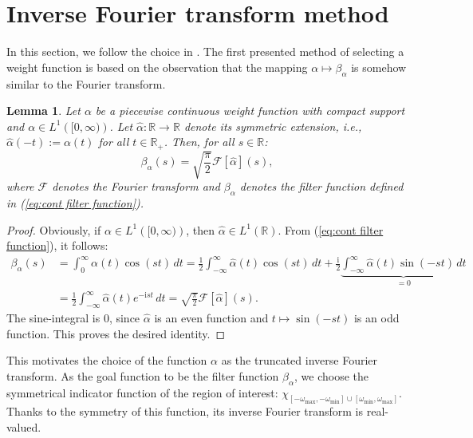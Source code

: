 \documentclass[a4paper,11pt,bibliography=totoc,listof=totoc,headinclude=true,cleardoublepage=empty,oneside]{scrbook}
\newtheorem{lemma}[theorem]{Lemma}
\newcommand{\R}{\mathbb{R}}
\renewcommand{\i}{\mathrm{i}}
\newcommand{\F}{\mathcal{F}}
\renewcommand{\eqref}[1]{(\ref{#1})}
\begin{document}
\section{Inverse Fourier transform method}\label{section:fourier}
In this section, we follow the choice in \cite{nannen}. The first presented method of selecting a weight function is based on the observation that the mapping $\alpha \mapsto \beta_\alpha$ is somehow similar to the Fourier transform.
\begin{lemma}\label{lemma:alpha fourier}
    Let $\alpha$ be a piecewise continuous weight function with compact support and $\alpha \in L^1\left( [0, \infty) \right)$. Let $\hat{\alpha}: \R \rightarrow \R$ denote its symmetric extension, i.e., $\hat{\alpha}(-t) := \alpha(t)$ for all $t\in \R_+$. Then, for all $s\in \R$:
    \begin{equation*}
        \beta_\alpha (s) = \sqrt{\frac{\pi}{2}} \F\left[\hat{\alpha}\right] (s),
    \end{equation*}
    where $\mathcal{F}$ denotes the Fourier transform and $\beta_\alpha$ denotes the filter function  defined in \eqref{eq:cont filter function}.
\end{lemma}
\begin{proof}
    Obviously, if $\alpha \in L^1\left([0, \infty)\right)$, then $\hat{\alpha} \in L^1\left(\R\right)$. From \eqref{eq:cont filter function}, it follows:
    \begin{align*}
        \beta_\alpha (s) &= \int_0^\infty \alpha(t) \cos(s t) \,dt = \frac{1}{2}\int_{-\infty}^\infty \hat{\alpha}(t) \cos(s t) \,dt + \frac{\i}{2} \underbrace{\int_{-\infty}^\infty \hat{\alpha}(t) \sin(-st) \,dt}_{=0} \\&= \frac{1}{2} \int_{-\infty}^{\infty} \hat{\alpha}(t) e^{-\i st} \, dt = \sqrt{\frac{\pi}{2}} \F\left[\hat{\alpha}\right] (s).
    \end{align*}
    The sine-integral is 0, since $\hat{\alpha}$ is an even function and $t \mapsto \sin(-st)$ is an odd function. This proves the desired identity.
\end{proof}

This motivates the choice of the function $\alpha$ as the truncated inverse Fourier transform. As the goal function to be the filter function $\beta_\alpha$, we choose the symmetrical indicator function of the region of interest: $\chi_{\left[-\omega_{\max}, -\omega_{\min}\right]\cup\left[\omega_{\min}, \omega_{\max}\right]}$. Thanks to the symmetry of this function, its inverse Fourier transform is real-valued.
\end{document}
